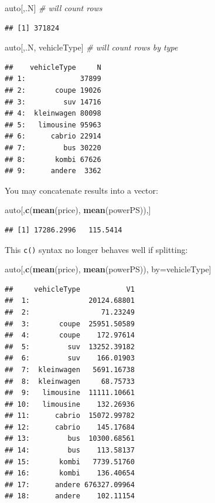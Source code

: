 \documentclass[]{book}
\newenvironment{Shaded}{\begin{snugshade}}{\end{snugshade}}
\newcommand{\CommentTok}[1]{\textcolor[rgb]{0.56,0.35,0.01}{\textit{#1}}}
\newcommand{\KeywordTok}[1]{\textcolor[rgb]{0.13,0.29,0.53}{\textbf{#1}}}
\newcommand{\NormalTok}[1]{#1}
\theoremstyle{definition}
\theoremstyle{definition}
\theoremstyle{definition}
\theoremstyle{remark}
\begin{document}
\begin{Shaded}
\begin{Highlighting}[]
\NormalTok{auto[,.N] }\CommentTok{# will count rows}
\end{Highlighting}
\end{Shaded}

\begin{verbatim}
## [1] 371824
\end{verbatim}

\begin{Shaded}
\begin{Highlighting}[]
\NormalTok{auto[,.N, vehicleType] }\CommentTok{# will count rows by type}
\end{Highlighting}
\end{Shaded}

\begin{verbatim}
##    vehicleType     N
## 1:             37899
## 2:       coupe 19026
## 3:         suv 14716
## 4:  kleinwagen 80098
## 5:   limousine 95963
## 6:      cabrio 22914
## 7:         bus 30220
## 8:       kombi 67626
## 9:      andere  3362
\end{verbatim}

You may concatenate results into a vector:

\begin{Shaded}
\begin{Highlighting}[]
\NormalTok{auto[,}\KeywordTok{c}\NormalTok{(}\KeywordTok{mean}\NormalTok{(price), }\KeywordTok{mean}\NormalTok{(powerPS)),]}
\end{Highlighting}
\end{Shaded}

\begin{verbatim}
## [1] 17286.2996   115.5414
\end{verbatim}

This \texttt{c()} syntax no longer behaves well if splitting:

\begin{Shaded}
\begin{Highlighting}[]
\NormalTok{auto[,}\KeywordTok{c}\NormalTok{(}\KeywordTok{mean}\NormalTok{(price), }\KeywordTok{mean}\NormalTok{(powerPS)), by=vehicleType]}
\end{Highlighting}
\end{Shaded}

\begin{verbatim}
##     vehicleType           V1
##  1:              20124.68801
##  2:                 71.23249
##  3:       coupe  25951.50589
##  4:       coupe    172.97614
##  5:         suv  13252.39182
##  6:         suv    166.01903
##  7:  kleinwagen   5691.16738
##  8:  kleinwagen     68.75733
##  9:   limousine  11111.10661
## 10:   limousine    132.26936
## 11:      cabrio  15072.99782
## 12:      cabrio    145.17684
## 13:         bus  10300.68561
## 14:         bus    113.58137
## 15:       kombi   7739.51760
## 16:       kombi    136.40654
## 17:      andere 676327.09964
## 18:      andere    102.11154
\end{verbatim}
\end{document}
